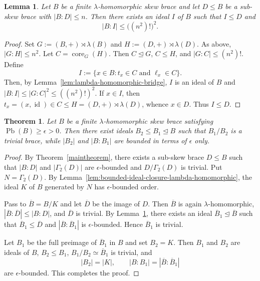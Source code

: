 \documentclass[11pt, oneside]{amsart}
\numberwithin{equation}{section}
\theoremstyle{plain}
\newtheorem{lem}[equation]{Lemma}
\newtheorem{thm}[equation]{Theorem}
\theoremstyle{definition}
\newcommand{\Pb}{\operatorname{Pb} }
\begin{document}
\begin{lem}\label{lem:finite-index-ideal-core-lambda-homomorphic}
Let $B$ be a finite $\lambda$-homomorphic skew brace and let $D\leqslant B$ be a sub-skew brace with $|B:D|\leqslant n$. Then there exists an ideal $I$ of $B$ such that $I\leqslant D$ and
$$
|B:I|\leqslant\big((n^2)!\big)^2.
$$
\end{lem}

\begin{proof}
Set $G :=(B,+)\rtimes\lambda(B)$ and $H :=(D,+)\rtimes\lambda(D)$. As above, $|G:H|\leqslant n^2$. Let $C=\operatorname{core}_G(H)$. Then $C\unlhd G$, $C\leqslant H$, and $|G:C|\leqslant(n^2)!$. Define 
$$I :=\{x\in B:t_x\in C\text{ and }\ell_x\in C\}.$$
Then, by Lemma~\ref{lem:lambda-homomorphic-bridge}, $I$ is an ideal of $B$ and $|B:I|\leqslant |G:C|^2\leqslant((n^2)!)^2$. If $x\in I$, then $t_x=(x,\operatorname{id})\in C\leqslant H=(D,+)\rtimes\lambda(D)$, whence $x\in D$. Thus $I\leqslant D$.
\end{proof}

\begin{thm}\label{thm:bfc-ideals-lambda-homomorphic}
Let $B$ be a finite $\lambda$-homomorphic skew brace satisfying $\Pb(B)\geqslant\epsilon>0$. Then there exist ideals $B_2\leqslant B_1\trianglelefteq B$ such that $B_1/B_2$ is a trivial brace, while $|B_2|$ and $|B:B_1|$ are bounded in terms of $\epsilon$ only.
\end{thm}

\begin{proof}
By Theorem~\ref{maintheorem}, there exists a sub-skew brace $D\leqslant B$ such that $|B:D|$ and $|\Gamma_2(D)|$ are $\epsilon$-bounded and $D/\Gamma_2(D)$ is trivial. Put $N=\Gamma_2(D)$. By Lemma~\ref{lem:bounded-ideal-closure-lambda-homomorphic}, the ideal $K$ of $B$ generated by $N$ has $\epsilon$-bounded order.

Pass to $\overline B=B/K$ and let $\overline D$ be the image of $D$. Then $\overline B$ is again $\lambda$-homomorphic, $|\overline B:\overline D|\leqslant |B:D|$, and $\overline D$ is trivial. By Lemma~\ref{lem:finite-index-ideal-core-lambda-homomorphic}, there exists an ideal $\overline B_1\trianglelefteq\overline B$ such that $\overline B_1\leqslant\overline D$ and $|\overline B:\overline B_1|$ is $\epsilon$-bounded. Hence $\overline B_1$ is trivial.

Let $B_1$ be the full preimage of $\overline B_1$ in $B$ and set $B_2=K$. Then $B_1$ and $B_2$ are ideals of $B$, $B_2\leqslant B_1$, $B_1/B_2\simeq\overline B_1$ is trivial, and
$$
|B_2|=|K|,\qquad |B:B_1|=|\overline B:\overline B_1|
$$
are $\epsilon$-bounded. This completes the proof.
\end{proof}
\end{document}
